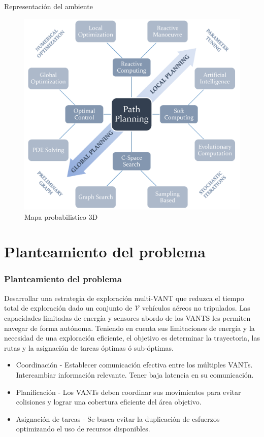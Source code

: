 \documentclass[
	12pt, %
	aspectratio=169, %
]{beamer}
\begin{document}
\begin{frame}{Representación del ambiente}

  \begin{figure}
    \centering
    \includegraphics[scale=0.60]{panorama_planning}
    \caption[Caption for LOF]{Mapa probabilistico 3D\protect\footnotemark}
  \end{figure}
  
\end{frame}

\section{Planteamiento del problema}

\begin{frame}
  \frametitle{Planteamiento del problema}
  Desarrollar una estrategia de exploración multi-VANT que reduzca el tiempo total de exploración dado un conjunto de $\mathcal{V}$ vehículos aéreos no tripulados. Las capacidades limitadas de energía y sensores abordo de los VANTS les permiten navegar de forma autónoma. Teniendo en cuenta sus limitaciones de energía y la necesidad de una exploración eficiente, el objetivo es determinar la trayectoria, las rutas y la asignación de tareas óptimas ó sub-óptimas.
  \bigskip %
  \begin{itemize}
  \item<1-> Coordinación - Establecer comunicación efectiva entre los múltiples VANTs. Intercambiar información relevante. Tener baja latencia en su comunicación.
  \item<2-> Planificación - Los VANTs deben coordinar sus movimientos para evitar colisiones y lograr una cobertura eficiente del área objetivo.
  \item<3-> Asignación de tareas - Se busca evitar la duplicación de esfuerzos optimizando el uso de recursos disponibles.
  \end{itemize}
  
\end{frame}
\end{document}

